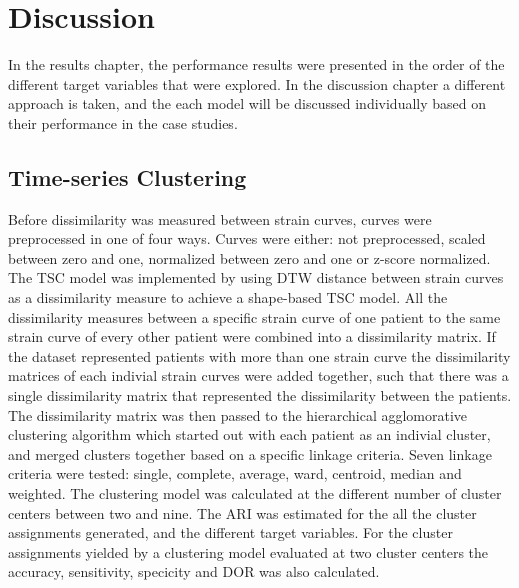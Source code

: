 \chapter{Discussion} \label{chap:discussion}

In the results chapter, the performance results were presented in the order of the different target variables that were explored. 
In the discussion chapter a different approach is taken, and the each model will be discussed individually based on their performance in the case studies.

\section{Time-series Clustering} \label{sec:disc_tsc}

Before dissimilarity was measured between strain curves, curves were preprocessed in one of four ways. 
Curves were either: not preprocessed, scaled between zero and one, normalized between zero and one or z-score normalized.
The TSC model was implemented by using DTW distance between strain curves as a dissimilarity measure to achieve a shape-based TSC model.
All the dissimilarity measures between a specific strain curve of one patient to the same strain curve of every other patient were combined into a dissimilarity matrix.
If the dataset represented patients with more than one strain curve the dissimilarity matrices of each indivial strain curves were added together, such that there was a single dissimilarity matrix that represented the dissimilarity between the patients.
The dissimilarity matrix was then passed to the hierarchical agglomorative clustering algorithm which started out with each patient as an indivial cluster, and merged clusters together based on a specific linkage criteria.
Seven linkage criteria were tested: single, complete, average, ward, centroid, median and weighted.
The clustering model was calculated at the different number of cluster centers between two and nine.
The ARI was estimated for the all the cluster assignments generated, and the different target variables.
For the cluster assignments yielded by a clustering model evaluated at two cluster centers the accuracy, sensitivity, specicity and DOR was also calculated. \bigskip

